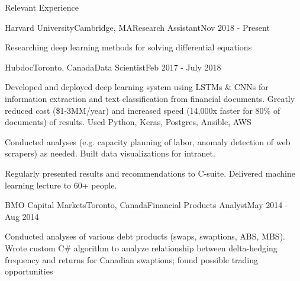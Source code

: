 \documentclass{resume} %
\begin{document}
\begin{rSection}{Relevant Experience}

\begin{rSubsection}{Harvard University}{Cambridge, MA}{Research Assistant}{Nov 2018 - Present}
\item Researching deep learning methods for solving differential equations
\end{rSubsection}


\begin{rSubsection}{Hubdoc}{Toronto, Canada}{Data Scientist}{Feb 2017 - July 2018}
\item Developed and deployed deep learning system using LSTMs \& CNNs for information extraction and text classification from financial documents. Greatly reduced cost (\$1-3MM/year) and increased speed (14,000x faster for 80\% of documents) of results. Used Python, Keras, Postgres, Ansible, AWS
\item Conducted analyses (e.g. capacity planning of labor, anomaly detection of web scrapers) as needed. Built data visualizations for intranet.
\item Regularly presented results and recommendations to C-suite. Delivered machine learning lecture to 60+ people.
\end{rSubsection}


\begin{rSubsection}{BMO Capital Markets}{Toronto, Canada}{Financial Products Analyst}{May 2014 - Aug 2014}
\item Conducted analyses of various debt products (swaps, swaptions, ABS, MBS). Wrote custom C\# algorithm to analyze relationship between delta-hedging frequency and returns for Canadian swaptions; found possible trading opportunities
\end{rSubsection}

\end{rSection}

\end{document}
